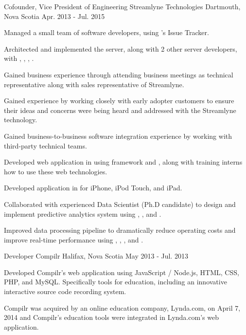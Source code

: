 \begin{cventries}
  \cventry
    {Cofounder, Vice President of Engineering} %
    {Streamlyne Technologies}  %
    {Dartmouth, Nova Scotia} %
    {Apr. 2013 - Jul. 2015} %
    {
      \begin{cvitems} %
	\item {Managed a small team of software developers, using 's Issue Tracker.}
	\item {Architected and implemented the  server, along with 2 other server developers, with , , , .}
	\item {Gained business  experience through attending business meetings as technical representative along with sales representative of Streamlyne.}
	\item {Gained  experience by working closely with early adopter customers to ensure their ideas and concerns were being heard and addressed with the Streamlyne technology.}
	\item {Gained business-to-business software integration experience by working with third-party technical teams.}
	\item {Developed web application in  using  framework and , along with training interns how to use these web technologies.}
	\item {Developed  application in  for iPhone, iPod Touch, and iPad.}
	\item {Collaborated with experienced Data Scientist (Ph.D candidate) to design and implement predictive analytics system using , , and .}
	\item {Improved data processing pipeline to dramatically reduce operating costs and improve real-time performance using , , , and .}
      \end{cvitems} 
    }

  \cventry
    {Developer} %
    {Compilr} %
    {Halifax, Nova Scotia} %
    {May 2013 - Jul. 2013} %
    {
      \begin{cvitems} %
	\item {Developed Compilr's web application using JavaScript / Node.js, HTML, CSS, PHP, and MySQL. Specifically tools for education, including an innovative interactive source code recording system.}
	\item {Compilr was acquired by an online education company, Lynda.com, on April 7, 2014 and Compilr's education tools were integrated in Lynda.com's web application.}
      \end{cvitems}
    }


\end{cventries}
